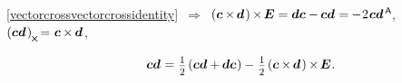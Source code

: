 \nopagebreak
{\centering \eqref{vectorcrossvectorcrossidentity}~$\Rightarrow$~${\left( \bm{c} \hspace{-0.1ex} \times \hspace{-0.2ex} \bm{d} \hspace{.2ex} \right) \hspace{-0.12ex} \times \hspace{-0.25ex} \bm{E} = \bm{d} \bm{c} - \hspace{-0.1ex} \bm{c} \bm{d} \hspace{.1ex} = \hspace{-0.1ex} - \hspace{.1ex} 2 \hspace{.15ex} \bm{c}\bm{d}^{\mathsf{\hspace{.3ex}A}}\hspace{-0.2ex}}$,\hspace{.32em}
${\left( \bm{c} \bm{d} \hspace{.2ex} \right)_{\hspace{-0.15ex}\Xcompanion} \hspace{-0.32ex} =
\hspace{.1ex} \bm{c} \hspace{-0.1ex} \times \hspace{-0.15ex} \bm{d} \hspace{.12ex}}$, \par}

\nopagebreak\vspace{-0.1em}\noindent
{}

\nopagebreak\vspace{-0.6em}\begin{equation}\label{symmetricantisymmetricdecompositionofdyad}
\hspace*{1em} \bm{c}\bm{d} \hspace{.1ex} = \hspace{.1ex}
\smalldisplaystyleonehalf \hspace{-0.1ex} \left( \bm{c}\bm{d} + \hspace{-0.1ex} \bm{d}\bm{c} \hspace{.1ex} \right)
- \hspace{.16ex} \smalldisplaystyleonehalf \hspace{-0.1ex} \left( \bm{c} \hspace{-0.1ex} \times \hspace{-0.2ex} \bm{d} \hspace{.2ex} \right) \hspace{-0.1ex} \times \hspace{-0.25ex} \UnitDyad
\hspace{.1ex} .
\end{equation}
